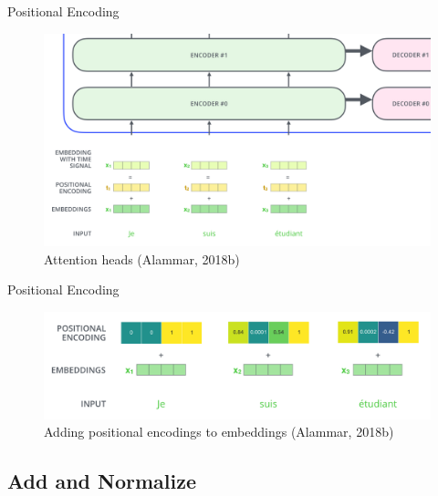 \documentclass[10pt]{beamer}
\begin{document}
\begin{frame}{Positional Encoding}

\begin{figure}[h]
\centering
\includegraphics[width=1\textwidth]{fig/alammar_transformer_positional_encoding_vectors.png}
\caption{Attention heads (Alammar, 2018b)}
\end{figure}

\end{frame}

\begin{frame}{Positional Encoding}

\begin{figure}[h]
\centering
\includegraphics[width=1\textwidth]{fig/alammar_transformer_positional_encoding_example.png}
\caption{Adding positional encodings to embeddings (Alammar, 2018b)}
\end{figure}

\end{frame}

\subsection{Add and Normalize}
\end{document}
